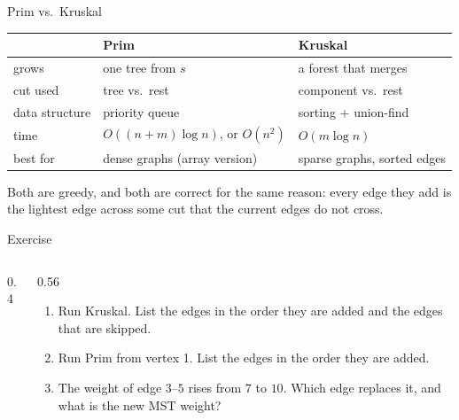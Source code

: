 \documentclass[10pt,aspectratio=169]{beamer}
\begin{document}
\begin{frame}{Prim vs.\ Kruskal}
  \begin{center}
  \begin{tabular}{lll}
    \toprule
    & Prim & Kruskal \\
    \midrule
    grows & one tree from $s$ & a forest that merges \\
    cut used & tree vs.\ rest & component vs.\ rest \\
    data structure & priority queue & sorting $+$ union-find \\
    time & $O((n + m) \log n)$, or $O(n^2)$ & $O(m \log n)$ \\
    best for & dense graphs (array version) & sparse graphs, sorted edges \\
    \bottomrule
  \end{tabular}
  \end{center}

  \bigskip
  Both are greedy, and both are correct for the same reason: every edge they
  add is the lightest edge across some cut that the current edges do not
  cross.
\end{frame}

\begin{frame}{Exercise}
  \begin{columns}[c]
    \begin{column}{0.4\textwidth}
      \begin{center}
      \end{center}
    \end{column}
    \begin{column}{0.56\textwidth}
      \begin{enumerate}
        \item Run Kruskal. List the edges in the order they are added and the
              edges that are skipped.
        \item Run Prim from vertex 1. List the edges in the order they are
              added.
        \item The weight of edge $3$--$5$ rises from $7$ to $10$. Which edge
              replaces it, and what is the new MST weight?
      \end{enumerate}
    \end{column}
  \end{columns}
\end{frame}
\end{document}
